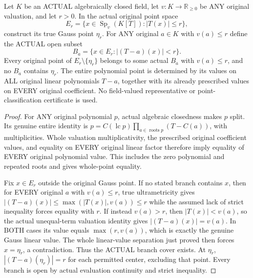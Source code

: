 \begin{lemma}
\label{analytic:actual-algclosed-disc-branch-cover}
\leanok
{}
Let $K$ be an ACTUAL algebraically closed field, let $v:K\to\mathbb R_{\ge0}$
be ANY original valuation, and let $r>0$. In the actual original point space
\[
 E_r=\{x\in\operatorname{Sp}_v(K[T]):|T(x)|\le r\},
\]
construct its true Gauss point $\eta_r$. For ANY original $a\in K$ with
$v(a)\le r$ define the ACTUAL open subset
\[
 B_a=\{x\in E_r:|(T-a)(x)|<r\}.
\]
Every original point of $E_r\setminus\{\eta_r\}$ belongs to some actual
$B_a$ with $v(a)\le r$, and no $B_a$ contains $\eta_r$. The entire polynomial
point is determined by its values on ALL original linear polynomials $T-a$,
together with its already prescribed values on EVERY original coefficient.
No field-valued representative or point-classification certificate is used.
\end{lemma}
\begin{proof}
For ANY original polynomial $p$, actual algebraic closedness makes $p$ split.
Its genuine entire identity is
$p=C(\operatorname{lc}p)\prod_{a\in\operatorname{roots}p}(T-C(a))$,
with multiplicities. Whole valuation multiplicativity, the prescribed
original coefficient values, and equality on EVERY original linear factor
therefore imply equality of EVERY original polynomial value. This includes
the zero polynomial and repeated roots and gives whole-point equality.

Fix $x\in E_r$ outside the original Gauss point. If no stated branch contains
$x$, then for EVERY original $a$ with $v(a)\le r$, true ultrametricity gives
$|(T-a)(x)|\le\max(|T(x)|,v(a))\le r$ while the assumed lack of strict
inequality forces equality with $r$. If instead $v(a)>r$, then
$|T(x)|<v(a)$, so the actual unequal-term valuation identity gives
$|(T-a)(x)|=v(a)$. In BOTH cases its value equals
$\max(r,v(a))$, which is exactly the genuine Gauss linear value.
The whole linear-value separation just proved then forces $x=\eta_r$,
a contradiction. Thus the ACTUAL branch cover exists. At $\eta_r$,
$|(T-a)(\eta_r)|=r$ for each permitted center, excluding that point.
Every branch is open by actual evaluation continuity and strict inequality.
\end{proof}

